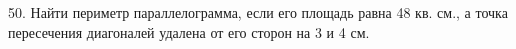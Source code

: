 50. Найти периметр параллелограмма, если его площадь равна 48 кв. см., а точка пересечения диагоналей удалена от его сторон на 3 и 4 см.\\
